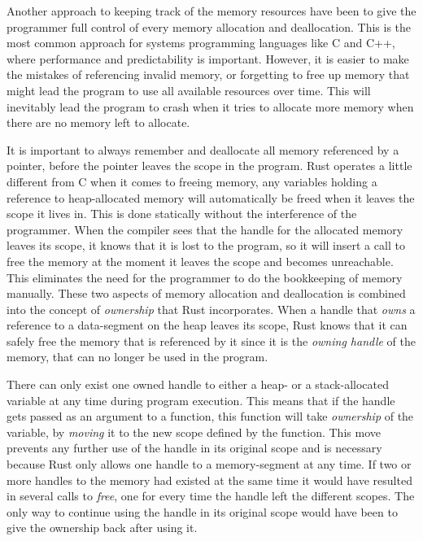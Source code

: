 Another approach to keeping track of the memory resources have been to give the programmer full
control of every memory allocation and deallocation. This is the most common approach for systems
programming languages like C and C++, where performance and predictability is important. However, it
is easier to make the mistakes of referencing invalid memory, or forgetting to free up memory that
might lead the program to use all available resources over time. This will inevitably lead the
program to crash when it tries to allocate more memory when there are no memory left to allocate.


It is important to always remember and deallocate all memory referenced by a pointer, before the
pointer leaves the scope in the program. Rust operates a little different from C when it comes to
freeing memory, any variables holding a reference to heap-allocated memory will automatically be
freed when it leaves the scope it lives in. This is done statically without the interference of the
programmer. When the compiler sees that the handle for the allocated memory leaves its scope, it
knows that it is lost to the program, so it will insert a call to free the memory at the moment it
leaves the scope and becomes unreachable. This eliminates the need for the programmer to do the
bookkeeping of memory manually. These two aspects of memory allocation and deallocation is combined
into the concept of \emph{ownership} that Rust incorporates. When a handle that \emph{owns} a
reference to a data-segment on the heap leaves its scope, Rust knows that it can safely free the
memory that is referenced by it since it is the \emph{owning handle} of the memory, that can no
longer be used in the program.


There can only exist one owned handle to either a heap- or a stack-allocated variable at any time
during program execution. This means that if the handle gets passed as an argument to a function,
this function will take \emph{ownership} of the variable, by \emph{moving} it to the new scope
defined by the function. This move prevents any further use of the handle in its original scope and
is necessary because Rust only allows one handle to a memory-segment at any time. If two or more
handles to the memory had existed at the same time it would have resulted in several calls to
\emph{free}, one for every time the handle left the different scopes. The only way to continue using
the handle in its original scope would have been to give the ownership back after using it.

